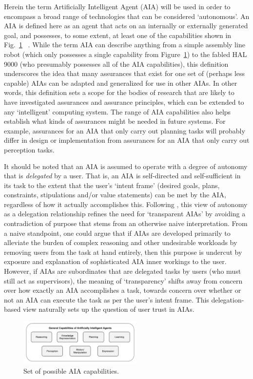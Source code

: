     Herein the term Artificially Intelligent Agent (AIA) will be used in order to encompass a broad range of technologies that can be considered `autonomous'.
    An AIA is defined here as an agent that acts on an internally or externally generated goal, and possesses, to some extent, at least one of the capabilities shown in Fig.~\ref{fig:AIcapabilities} ~\cite{Russell2010-wv,Nilsson2009-rp,Luger2008-vf}. 
    While the term AIA can describe anything from a simple assembly line robot (which only possesses a single capability from Figure~\ref{fig:AIcapabilities}) to the fabled HAL 9000 (who presumably possesses all of the AIA capabilities), this definition underscores the idea that many assurances that exist for one set of (perhaps less capable) AIAs can be adapted and generalized for use in other AIAs.
    In other words, this definition sets a scope for the bodies of research that are likely to have investigated assurances and assurance principles, which can be extended to any `intelligent' computing system. 
    The range of AIA capabilities also helps establish what kinds of assurances might be needed in future systems. 
    For example, assurances for an AIA that only carry out planning tasks will probably differ in design or implementation from assurances for an AIA that only carry out perception tasks. 
    
    It should be noted that an AIA is assumed to operate with a degree of autonomy that is \emph{delegated} by a user. That is, an AIA is self-directed and self-sufficient in its task to the extent that the user's `intent frame' (desired goals, plans, constraints, stipulations and/or value statements) can be met by the AIA, regardless of how it actually accomplishes this. %
    Following \citet{Miller2014-av}, this view of autonomy as a delegation relationship refines the need for `transparent AIAs' by avoiding a contradiction of purpose that stems from an otherwise naive interpretation. From a naive standpoint, one could argue that if AIAs are developed primarily to alleviate the burden of complex reasoning and other undesirable workloads by removing users from the task at hand entirely, then this purpose is undercut by exposure and explanation of sophisticated AIA inner workings to the user. 
    However, if AIAs are subordinates that are delegated tasks by users (who must still act as supervisors), the meaning of `transparency' shifts away from concern over how exactly an AIA accomplishes a task, towards concern over whether or not an AIA can execute the task as per the user's intent frame. 
    This delegation-based view naturally sets up the question of user trust in AIAs. 

	\begin{figure}[t!]%
    	\centering
     	\includegraphics[width=0.55\textwidth]{Figures/AI_capabilities}
    	\caption{Set of possible AIA capabilities.}
        \label{fig:AIcapabilities}
        \vspace{-0.2 in}
    \end{figure}
